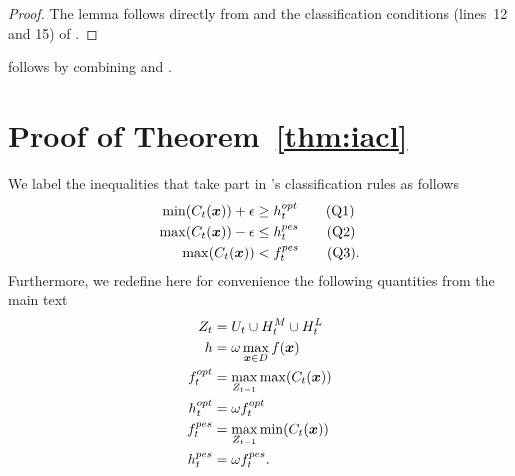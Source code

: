 
\begin{proof}
The lemma follows directly from  and the classification
conditions (lines~12 and 15) of .
\end{proof}

\noindent{} follows by combining 
and .


\section{Proof of Theorem~\ref*{thm:iacl}} \label{app:iacl}

\begin{definition}
We label the inequalities that take part in \iacl's classification rules
as follows
\begin{align*}
\min(C_t(\bm{x})) + \epsilon &\geq h_t^{opt} \tag{Q1}\\
\max(C_t(\bm{x})) - \epsilon &\leq h_t^{pes} \tag{Q2}\\
\max(C_t(\bm{x})) &< f_t^{pes} \tag{Q3}.
\end{align*}
Furthermore, we redefine here for convenience the following quantities
from the main text
\begin{align*}
Z_t &= U_t \cup H^M_t \cup H^L_t\\
h &= \omega \max_{\bm{x} \in D} f(\bm{x})\\
f^{opt}_t &= \max_{Z_{t-1}}\max(C_t(\bm{x}))\\
h^{opt}_t &= \omega f^{opt}_t\\
f^{pes}_t &= \max_{Z_{t-1}}\min(C_t(\bm{x}))\\
h^{pes}_t &= \omega f^{pes}_t.
\end{align*}
\end{definition}

